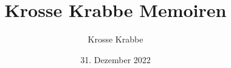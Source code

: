 \documentclass[a4paper,twocolumn]{book}
\begin{document}
\title{Krosse Krabbe Memoiren}
\author{Krosse Krabbe}
\date{31. Dezember 2022}

\maketitle
\tableofcontents


\end{document}
